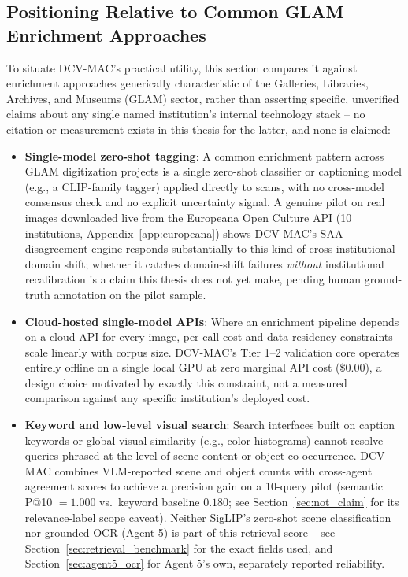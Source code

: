 \documentclass[12pt,a4paper]{report}
\begin{document}
\subsection{Positioning Relative to Common GLAM Enrichment Approaches}
To situate DCV-MAC's practical utility, this section compares it against enrichment approaches
generically characteristic of the Galleries, Libraries, Archives, and Museums (GLAM) sector, rather than
asserting specific, unverified claims about any single named institution's internal technology stack --
no citation or measurement exists in this thesis for the latter, and none is claimed:
\begin{itemize}
    \item \textbf{Single-model zero-shot tagging}: A common enrichment pattern across GLAM digitization
    projects is a single zero-shot classifier or captioning model (e.g., a CLIP-family tagger) applied
    directly to scans, with no cross-model consensus check and no explicit uncertainty signal. A genuine
    pilot on real images downloaded live from the Europeana Open Culture API (10 institutions,
    Appendix~\ref{app:europeana}) shows DCV-MAC's SAA disagreement engine responds substantially to this
    kind of cross-institutional domain shift; whether it catches domain-shift failures \emph{without}
    institutional recalibration is a claim this thesis does not yet make, pending human ground-truth
    annotation on the pilot sample.
    \item \textbf{Cloud-hosted single-model APIs}: Where an enrichment pipeline depends on a cloud API for
    every image, per-call cost and data-residency constraints scale linearly with corpus size. DCV-MAC's
    Tier 1--2 validation core operates entirely offline on a single local GPU at zero marginal API cost
    (\$0.00), a design choice motivated by exactly this constraint, not a measured comparison against any
    specific institution's deployed cost.
    \item \textbf{Keyword and low-level visual search}: Search interfaces built on caption keywords or
    global visual similarity (e.g., color histograms) cannot resolve queries phrased at the level of scene
    content or object co-occurrence. DCV-MAC combines VLM-reported scene and object counts with
    cross-agent agreement scores to achieve a precision gain on a 10-query pilot (semantic P@10 $=1.000$
    vs.\ keyword baseline $0.180$; see Section~\ref{sec:not_claim} for its relevance-label scope caveat).
    Neither SigLIP's zero-shot scene classification nor grounded OCR (Agent 5) is part of this retrieval
    score -- see Section~\ref{sec:retrieval_benchmark} for the exact fields used, and
    Section~\ref{sec:agent5_ocr} for Agent 5's own, separately reported reliability.
\end{itemize}
\end{document}
